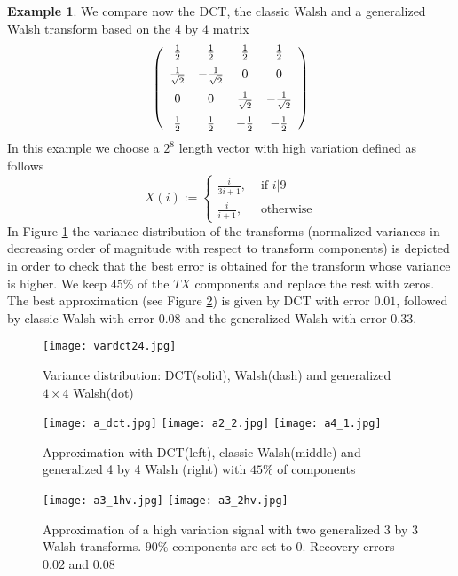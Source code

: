 \documentclass[11pt]{amsart}
\theoremstyle{definition}
\newtheorem{example}[theorem]{Example}
\theoremstyle{remark}
\numberwithin{equation}{section}
\begin{document}
\begin{example}
We compare now  the DCT, the classic  Walsh and a generalized Walsh transform based on the 4 by 4 matrix
\begin{equation}\label{4by4}
\left( \begin {array}{cccc} \frac{1}{2} & \frac{1}{2} & \frac{1}{2} & \frac{1}{2}\\
\noalign{\medskip}  \frac{1}{\sqrt{2}} & -\frac{1}{\sqrt{2}}   & 0  & 0\\
 \noalign{\medskip}  0  & 0 & \frac{1}{\sqrt{2}}&-\frac{1}{\sqrt{2}}\\
 \noalign{\medskip}   \frac{1}{2} & \frac{1}{2}  & -\frac{1}{2 }&-\frac{1}{2}
\end {array} \right)
\end{equation}
In this example we choose a  $2^8$ length vector with high variation defined as follows
$$
X(i):=\left\{ \begin{array}{cc}
\frac{i}{3i+1},&\text{ if }i\text{}|\text{}9\\
\frac{i}{i+1},&\text{ otherwise}
\end{array}\right.
$$
In Figure \ref{wardct} the variance distribution of the transforms (normalized variances in decreasing order of magnitude with respect to transform components) is depicted in order to check that the best error is obtained for the transform whose variance is higher. We keep $45\%$ of the $TX$ components and replace the rest with zeros. The best approximation (see Figure \ref{warpd42}) is given by DCT with error $0.01$, followed by classic Walsh with error $0.08 $ and the generalized Walsh with error $0.33$.

\begin{figure}
\centering
    \texttt{[image: vardct24.jpg]}
\caption{Variance distribution: DCT(solid), Walsh(dash) and generalized $4\times 4$ Walsh(dot) }
\label{wardct}
\end{figure}


\begin{figure}
 \texttt{[image: a\_dct.jpg]}
   \texttt{[image: a2\_2.jpg]}
 \texttt{[image: a4\_1.jpg]}
\label{warpd42}
\caption{Approximation with DCT(left), classic Walsh(middle) and generalized 4 by 4 Walsh (right) with $45\%$ of components }
\end{figure}

\begin{figure}
 \texttt{[image: a3\_1hv.jpg]}
   \texttt{[image: a3\_2hv.jpg]}
\label{hvab}
\caption{Approximation of a high variation signal with two generalized 3 by 3 Walsh transforms. $90\%$ components are set to $0$. Recovery errors $0.02$ and $0.08$ }
\end{figure}


\end{example}
\end{document}
